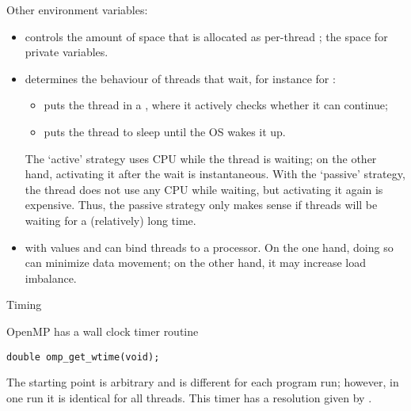 Other environment variables:
\begin{itemize}
\item {} controls the amount of space that is
  allocated as per-thread ; the space for private
  variables.
\item {} determines the behaviour of
  threads that wait, for instance for :
  \begin{itemize}
  \item {} puts the thread in a , where
    it actively checks whether it can continue;
  \item {} puts the thread to sleep until the \ac{OS} wakes
    it up.
  \end{itemize}
  The `active' strategy uses CPU while the thread is waiting; on the
  other hand, activating it after the wait is instantaneous. With the
  `passive' strategy, the thread does not use any CPU while waiting,
  but activating it again is expensive. Thus, the passive strategy
  only makes sense if threads will be waiting for a (relatively) long
  time.
\item {} with values  and 
  can bind threads to a processor. On the one hand, doing so can
  minimize data movement; on the other hand, it may increase load
  imbalance.
\end{itemize}


 {Timing}
\label{sec:omp-timing}

OpenMP has a wall clock timer routine 
\begin{lstlisting}
double omp_get_wtime(void);
\end{lstlisting}
The starting point is arbitrary and is different for each program run;
however, in one run it is identical for all threads.
This timer has a resolution given by .

